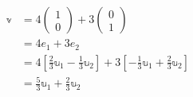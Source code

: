 \begin{align*}
    \mathbb{v} & = 4 \begin{pmatrix}
        1 \\
        0
    \end{pmatrix} + 3 \begin{pmatrix}
        0 \\
        1
    \end{pmatrix} \\
    & = 4e_1 + 3e_2 \\
    & = 4 \left[ \frac{2}{3} \mathbb{u}_1 - \frac{1}{3} \mathbb{u}_2 \right] + 3 \left[ -\frac{1}{3} \mathbb{u}_1 + \frac{2}{3} \mathbb{u}_2 \right] \\
    & = \frac{5}{3} \mathbb{u}_1 + \frac{2}{3} \mathbb{u}_2
\end{align*}

